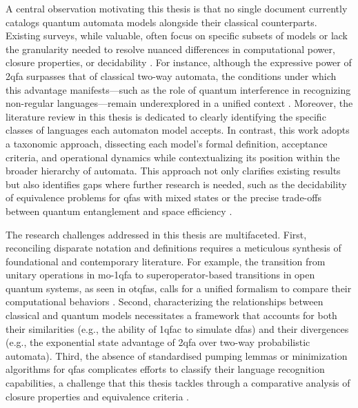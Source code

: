 A central observation motivating this thesis is that no single document currently catalogs quantum automata models alongside their classical counterparts. Existing surveys, while valuable, often focus on specific subsets of models or lack the granularity needed to resolve nuanced differences in computational power, closure properties, or decidability \cite{gruska2012quantum}. For instance, although the expressive power of \gls{2qfa} surpasses that of classical two-way automata, the conditions under which this advantage manifests—such as the role of quantum interference in recognizing non-regular languages—remain underexplored in a unified context \cite{yakaryilmaz2010succinctness}. Moreover, the literature review in this thesis is dedicated to clearly identifying the specific classes of languages each automaton model accepts. In contrast, this work adopts a taxonomic approach, dissecting each model’s formal definition, acceptance criteria, and operational dynamics while contextualizing its position within the broader hierarchy of automata. This approach not only clarifies existing results but also identifies gaps where further research is needed, such as the decidability of equivalence problems for \glspl{qfa} with mixed states or the precise trade-offs between quantum entanglement and space efficiency \cite{hirvensalo2012quantum}.  

The research challenges addressed in this thesis are multifaceted. First, reconciling disparate notation and definitions requires a meticulous synthesis of foundational and contemporary literature. For example, the transition from unitary operations in \gls{mo-1qfa} to superoperator-based transitions in open quantum systems, as seen in \glspl{otqfa}, calls for a unified formalism to compare their computational behaviors \cite{bertoni2001quantum, breuer2002theory}. Second, characterizing the relationships between classical and quantum models necessitates a framework that accounts for both their similarities (e.g., the ability of \gls{1qfac} to simulate \glspl{dfa}) and their divergences (e.g., the exponential state advantage of \gls{2qfa} over two-way probabilistic automata). Third, the absence of standardised pumping lemmas or minimization algorithms for \glspl{qfa} complicates efforts to classify their language recognition capabilities, a challenge that this thesis tackles through a comparative analysis of closure properties and equivalence criteria \cite{yakaryilmaz2014quantum}.  


